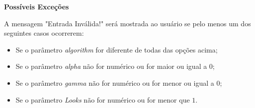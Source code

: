 \textbf{Possíveis Exceções}

\vspace{0.5cm}

A mensagem "Entrada Inválida!" será mostrada ao usuário se pelo menos um dos seguintes casos ocorrerem:

\begin{itemize}
    \item Se o parâmetro \textit{algorithm} for diferente de todas das opções acima;
    \item Se o parâmetro \textit{alpha} não for numérico ou for maior ou igual a $0$;
    \item Se o parâmetro \textit{gamma} não for numérico ou for menor ou igual a $0$;
    \item Se o parâmetro \textit{Looks} não for numérico ou for menor que $1$.
\end{itemize}



